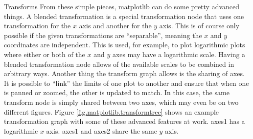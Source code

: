\begin{aosasect1}{Transforms}
From these simple pieces, matplotlib can do some pretty advanced
things.  A blended transformation is a special transformation node
that uses one transformation for the $x$ axis and another for the $y$
axis.  This is of course only possible if the given transformations
are ``separable'', meaning the $x$ and $y$ coordinates are
independent.  This is used, for example, to plot logarithmic plots
where either or both of the $x$ and $y$ axes may have a logarithmic
scale.  Having a blended transformation node allows of the available
scales to be combined in arbitrary ways.  Another thing the transform
graph allows is the sharing of axes.  It is possible to ``link'' the
limits of one plot to another and ensure that when one is panned or
zoomed, the other is updated to match.  In this case, the same
transform node is simply shared between two axes, which may even be on
two different figures.  Figure \ref{fig.matplotlib.transformtree}
shows an example transformation graph with some of these advanced
features at work.  axes1 has a logarithmic $x$ axis.  axes1 and axes2
share the same $y$ axis.


\end{aosasect1}

